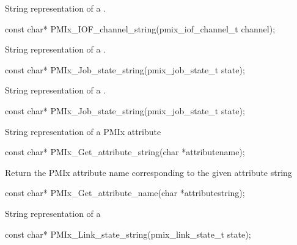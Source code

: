 \summary
{}

String representation of a .

\cspecificstart
\begin{codepar}
const char*
PMIx_IOF_channel_string(pmix_iof_channel_t channel);
\end{codepar}
\cspecificend

\summary
{}

String representation of a .

\cspecificstart
\begin{codepar}
const char*
PMIx_Job_state_string(pmix_job_state_t state);
\end{codepar}
\cspecificend



\summary
{}

String representation of a .

\cspecificstart
\begin{codepar}
const char*
PMIx_Job_state_string(pmix_job_state_t state);
\end{codepar}
\cspecificend


\summary
{}

String representation of a \ac{PMIx} attribute

\cspecificstart
\begin{codepar}
const char*
PMIx_Get_attribute_string(char *attributename);
\end{codepar}
\cspecificend


\summary
{}

Return the \ac{PMIx} attribute name corresponding to the given attribute string

\cspecificstart
\begin{codepar}
const char*
PMIx_Get_attribute_name(char *attributestring);
\end{codepar}
\cspecificend


\summary
{}

String representation of a 

\cspecificstart
\begin{codepar}
const char*
PMIx_Link_state_string(pmix_link_state_t state);
\end{codepar}
\cspecificend


